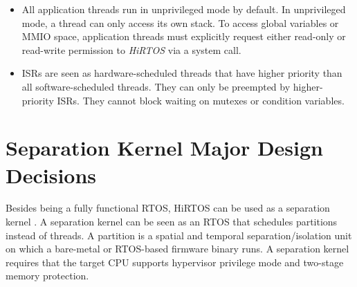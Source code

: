\documentclass[11pt,letterpaper,twoside,openany]{book}
\begin{document}
\begin{itemize}
\item
All application threads run in unprivileged mode by default. In unprivileged mode, a thread can only
access its own stack. To access global variables or MMIO space, application threads must explicitly
request either read-only or read-write permission to \emph{HiRTOS} via a system call.

\item ISRs are seen as hardware-scheduled threads that have higher priority than all software-scheduled
threads. They can only be preempted by higher-priority ISRs. They cannot block waiting on mutexes or
condition variables.

\end{itemize}

\section{Separation Kernel Major Design Decisions}

Besides being a fully functional RTOS, HiRTOS can be used as a separation kernel \cite{SepK1, SepK2}.
A separation kernel can be seen as an RTOS that schedules partitions instead of threads. A partition
is a spatial and temporal separation/isolation unit on which a bare-metal or RTOS-based firmware
binary runs. A separation kernel requires that the target CPU supports hypervisor privilege mode
and two-stage memory protection.
\end{document}
